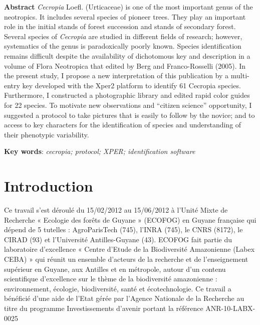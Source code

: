 \documentclass[a4paper]{article}
\theoremstyle{definition}
\theoremstyle{definition}
\theoremstyle{definition}
\theoremstyle{remark}
\begin{document}
\textbf{Abstract} \emph{Cecropia} Loefl. (Urticaceae) is one of the most
important genus of the neotropics. It includes several species of
pioneer trees. They play an important role in the initial stands of
forest succession and stands of secondary forest. Several species of
\emph{Cecropia} are studied in different fields of research; however,
systematics of the genus is paradoxically poorly known. Species
identification remains difficult despite the availability of dichotomous
key and description in a volume of Flora Neotropica that edited by Berg
and Franco-Rosselli (2005). In the present study, I propose a new
interpretation of this publication by a multi-entry key developed with
the Xper2 platform to identify 61 Cecropia species. Furthermore, I
constructed a photographic library and edited rapid color guides for 22
species. To motivate new observations and ``citizen science''
opportunity, I suggested a protocol to take pictures that is easily to
follow by the novice; and to access to key characters for the
identification of species and understanding of their phenotypic
variability.

\textbf{Key words}: \emph{cecropia; protocol; XPER; identification
software} \pagebreak


\section{Introduction}\label{intro}

Ce travail s'est déroulé du 15/02/2012 au 15/06/2012 à l'Unité Mixte de
Recherche « Ecologie des forêts de Guyane » (ECOFOG) en Guyane française
qui dépend de 5 tutelles : AgroParisTech (745), l'INRA (745), le CNRS
(8172), le CIRAD (93) et l'Université Antilles-Guyane (43). ECOFOG fait
partie du laboratoire d'excellence « Centre d'Etude de la Biodiversité
Amazonienne (Labex CEBA) » qui réunit un ensemble d'acteurs de la
recherche et de l'enseignement supérieur en Guyane, aux Antilles et en
métropole, autour d'un contenu scientifique d'excellence sur le thème de
la biodiversité amazonienne : environnement, écologie, biodiversité,
santé et écotechnologie. Ce travail a bénéficié d'une aide de l'Etat
gérée par l'Agence Nationale de la Recherche au titre du programme
Investissements d'avenir portant la référence ANR-10-LABX-0025
\end{document}
